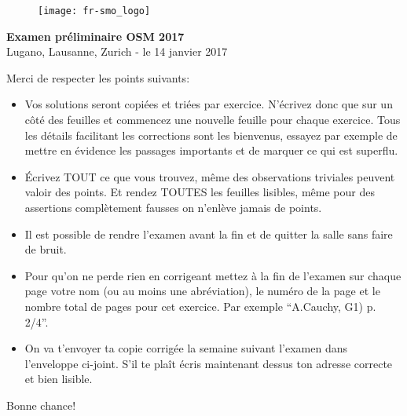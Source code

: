\documentclass[12pt,a4paper]{article}
\begin{document}
\thispagestyle{empty}
\begin{figure}[h]
\texttt{[image: fr-smo\_logo]}
\end{figure}

\vspace{1cm}

\begin{center}
\Huge{\textbf{Examen préliminaire OSM 2017}}\\[1.5cm]
\large{Lugano, Lausanne, Zurich - le 14 janvier 2017}\\[3.5cm]
\end{center}


Merci de respecter les points suivants:

\begin{itemize}
\item Vos solutions seront copiées et triées par exercice. N'écrivez donc que sur un côté des feuilles et commencez une nouvelle feuille pour chaque exercice. Tous les détails facilitant les corrections sont les bienvenus, essayez par exemple de mettre en évidence les passages importants et de marquer ce qui est superflu.

\item Écrivez TOUT ce que vous trouvez, même des observations triviales peuvent valoir des points. Et rendez TOUTES les feuilles lisibles, même pour des assertions complètement fausses on n'enlève jamais de points.


\item Il est possible de rendre l'examen avant la fin et de quitter la salle sans faire de bruit.

\item Pour qu'on ne perde rien en corrigeant mettez à la fin de l'examen sur chaque page votre nom (ou au moins une abréviation), le numéro de la page et le nombre total de pages pour cet exercice. Par exemple "`A.Cauchy, G1) p. 2/4"'.

\item On va t'envoyer ta copie corrigée la semaine suivant l'examen dans l'enveloppe ci-joint. S'il te plaît écris maintenant dessus ton adresse correcte et bien lisible.

\end{itemize}

\vfill

\begin{center}
Bonne chance!
\end{center}
\end{document}
